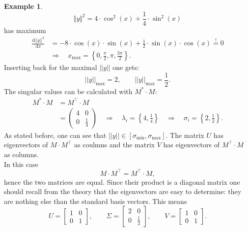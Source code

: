 \documentclass[a4paper,12 pt]{article}
\numberwithin{equation}{section}
\theoremstyle{definition}
\newtheorem{bsp}{Example}
\theoremstyle{remark}
\theoremstyle{definition}
\theoremstyle{definition}
\theoremstyle{definition}
\theoremstyle{remark}
\begin{document}
\begin{bsp}
\begin{equation*}\label{maxbet}
\Vert y \Vert^2 = 4\cdot\cos^2(x)+\frac{1}{4}\cdot\sin^2(x)
\end{equation*}
has maximum
\begin{equation*}
\begin{split}
\frac{\text{d}|| y ||^2}{\text{d}x}&=-8\cdot\cos(x)\cdot\sin(x)+\frac{1}{2}\cdot\sin(x)\cdot\cos(x)\overset{!}{=}0\\
&\Rightarrow\quad x_\text{max}=\left\{0,\frac{\pi}{2},\pi,\frac{3\pi}{2}\right\}.
\end{split}
\end{equation*}
Inserting back for the maximal $||y||$ one gets:
\begin{equation*}
|| y||_\text{max}=2, \qquad  || y||_\text{max}=\frac{1}{2}.
\end{equation*}
The singular values can be calculated with $M^*\cdot M$:
\begin{equation*}
\begin{split}
M^\ast\cdot M&=M^\intercal\cdot M\\
&=\begin{pmatrix} 4 & 0 \\ 0 & \frac{1}{4} \end{pmatrix} \quad \Rightarrow\quad \lambda_i=\left\{4,\frac{1}{4}\right\} \quad \Rightarrow\quad \sigma_i=\left\{2,\frac{1}{2}\right\}.
\end{split}
\end{equation*}
As stated before, one can see that $|| y|| \in[\sigma_\text{min},\sigma_\text{max}]$.
The matrix $U$ has eigenvectors of $M\cdot M^\intercal$ as coulmns and the matrix $V$ has eigenvectors of $M^\intercal\cdot M$ as columns. \\
In this case $$M\cdot M^\intercal=M^\intercal\cdot M,$$ hence the two matrices are equal. Since their product is a diagonal matrix one should recall from the theory that the eigenvectors are easy to determine: they are nothing else than the standard basis vectors. This means
\begin{equation*}
U = \begin{bmatrix} 1 & 0 \\ 0 & 1\end{bmatrix}, \qquad \Sigma=\begin{bmatrix} 2 & 0 \\ 0 & \frac{1}{2}\end{bmatrix}, \qquad V=\begin{bmatrix} 1 & 0 \\ 0 & 1\end{bmatrix}.
\end{equation*}

\end{bsp}
\end{document}
